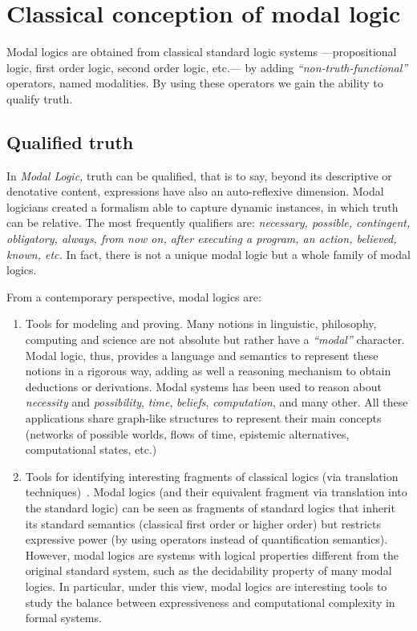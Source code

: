 
\section{Classical conception of modal logic}

Modal logics are obtained from classical standard logic systems
---propositional logic, first order logic, second order logic, etc.--- by
adding \emph{``non-truth-functional''}
operators, named modalities. By using these operators we gain the ability to
qualify truth.

\subsection{Qualified truth}

In \textit{Modal Logic,} truth can be qualified, that is to say, beyond its
descriptive or denotative content, expressions have also an auto-reflexive
dimension. Modal logicians created a formalism able to capture dynamic
instances, in which truth can be relative. The most frequently qualifiers
are: \emph{necessary, possible, contingent, obligatory, always, from now on,
after executing a program, an action, believed, known, etc. }In fact, there
is not a unique modal logic but a whole family of modal logics.

From a contemporary perspective, modal logics are:

\begin{enumerate}
\item Tools for modeling and proving. Many notions in linguistic,
philosophy, computing and science are not absolute but rather have a 
\emph{``modal''} character. Modal logic, thus,
provides a language and semantics to represent these notions in a rigorous
way, adding as well a reasoning mechanism to obtain deductions or
derivations. Modal systems has been used to reason about \emph{necessity}
and \emph{possibility}, \emph{time}, \emph{beliefs}, \emph{computation}, and
many other. All these applications share graph-like structures to represent
their main concepts (networks of possible worlds, flows of time, epistemic
alternatives, computational states, etc.)

\item Tools for identifying interesting fragments of classical logics (via
translation techniques)~\cite{Blackburnetal2007}. Modal logics (and
their equivalent fragment via translation into the standard logic) can be
seen as fragments of standard logics that inherit its standard semantics
(classical first order or higher order) but restricts expressive power (by
using operators instead of quantification semantics). However, modal logics
are systems with logical properties different from the original standard
system, such as the decidability property of many modal logics. In
particular, under this view, modal logics are interesting tools to study the
balance between expressiveness and computational complexity in formal systems.
\end{enumerate}


